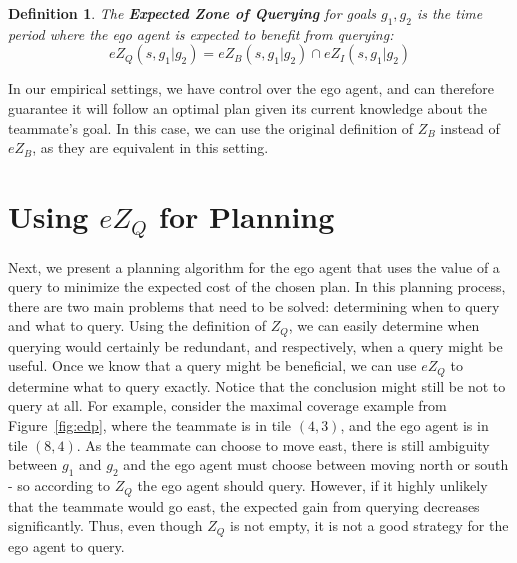 \documentclass[letterpaper]{article}
\newtheorem{definition}{Definition}
\begin{document}
\begin{definition}
The \textbf{Expected Zone of Querying}  for goals $g_1, g_2$ is the time period where the ego agent is expected to benefit from querying:
\begin{equation*}
    eZ_Q(s, g_1 | g_2) = eZ_B(s, g_1 | g_2) \cap eZ_I(s, g_1 | g_2)
\end{equation*}
\end{definition}
In our empirical settings, we have control over the ego agent, and can therefore guarantee it will follow an optimal plan given its current knowledge about the teammate's goal. In this case, we can use the original definition of $Z_B$ instead of $eZ_B$, as they are equivalent in this setting.

\section{Using $eZ_Q$ for Planning}
\label{sec:alg}
Next, we present a planning algorithm for the ego agent that uses the value of a query to minimize the expected cost of the chosen plan. In this planning process, there are two main problems that need to be solved: determining when to query and what to query. Using the definition of $Z_Q$, we can easily determine when querying would certainly be redundant, and respectively, when a query might be useful. Once we know that a query might be beneficial, we can use $eZ_Q$ to determine what to query exactly. Notice that the conclusion might still be not to query at all. For example, consider the maximal coverage example from Figure~\ref{fig:edp}, where the teammate is in tile $(4,3)$, and the ego agent is in tile $(8,4)$. As the teammate can choose to move east, there is still ambiguity between $g_1$ and $g_2$ and the ego agent must choose between moving north or south - so according to $Z_Q$ the ego agent should query. However, if it highly unlikely that the teammate would go east, the expected gain from querying decreases significantly. Thus, even though $Z_Q$ is not empty, it is not a good strategy for the ego agent to query. %
\end{document}
